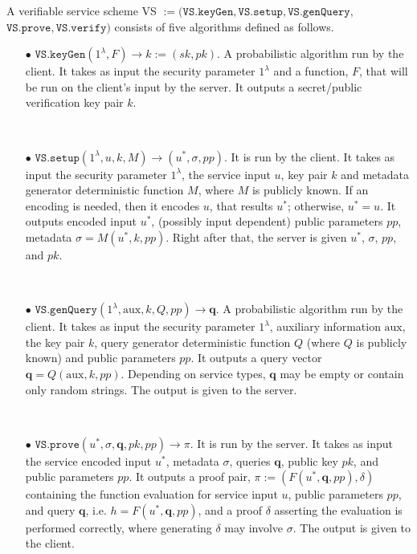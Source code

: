 \begin{definition}[VS Scheme]\label{service-def}
A verifiable service scheme VS $:=(\mathtt{VS.keyGen}, \mathtt{VS.setup},\mathtt{VS.genQuery},$ $\mathtt{VS.prove},\mathtt{VS.verify})$ consists of five algorithms defined as follows.


\begin{itemize}

\item[$\bullet$] $\mathtt{VS.keyGen}(1^{\lambda},F)\rightarrow k:=(sk,pk)$.  A probabilistic algorithm run by the client. It takes as input the security parameter $1^{\lambda}$ and a function, $F$, that will be run on the client's input by the server. It outputs a secret/public verification key pair $k$. 



\

\item[$\bullet$] $\mathtt{VS.setup}(1^{\lambda}, u,k, M)\rightarrow (u^{\scriptscriptstyle *},\sigma,{pp})$. It is run by the client. It takes as input the security parameter $1^{\lambda}$,  the service input $u$,    key pair $k$ and metadata generator deterministic function $M$, where $M$ is publicly known. If an encoding is needed, then it encodes $u$, that results $u^{\scriptscriptstyle *}$; otherwise, $u^*=u$. It outputs encoded input $u^{\scriptscriptstyle *}$, (possibly input dependent) public parameters {$pp$}, metadata $\sigma=M(u^{\scriptscriptstyle *},k,{pp})$. Right after that, the server is  given $u^{\scriptscriptstyle *}$,  $\sigma$, {$pp$}, and $pk$.




\

\item[$\bullet$] $\mathtt{VS.genQuery}(1^{\lambda}, \text{aux},k,Q,{pp})\rightarrow \bm{q}$. A probabilistic algorithm run by the client. It takes as input the security parameter $1^{\lambda}$, auxiliary information $\text{aux}$,   the key pair $k$,   query generator deterministic function $Q$ (where $Q$ is publicly known) and {public parameters $pp$}. It outputs  a query vector $\bm{q}=Q( \text{aux},k,{pp})$.  Depending on service types, $\bm{q}$ may be empty or contain only random strings. The output  is given to the server. 

\




\item[$\bullet$] $\mathtt{VS.prove}(u^{\scriptscriptstyle *},\sigma, \bm{q}, pk,{pp})\rightarrow \pi$. It is run by the server. It  takes as input the service encoded input $u^{\scriptscriptstyle *}$, metadata $\sigma$,   queries $\bm{q}$, public key $pk$, and { public parameters  $pp$}. It outputs a proof pair, $\pi :=(F(u^{\scriptscriptstyle *}, \bm{q},{pp}),\delta)$ containing the function evaluation for service input $u$, {public parameters $pp$}, and query $\bm{q}$, i.e. $h=F(u^{\scriptscriptstyle *},\bm{q},{pp})$, and a proof $\delta$ asserting the evaluation is performed correctly, where generating $\delta$ may involve $\sigma$. The output is given to the client. 


\end{itemize}
\end{definition}
